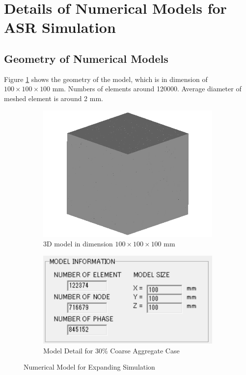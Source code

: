 \section{Details of Numerical Models for ASR Simulation}

\subsection{Geometry of Numerical Models}

Figure \ref{fig:model} shows the geometry of the model, which is in dimension of $100 \times 100 \times 100$ mm. Numbers of elements around 120000. Average diameter of meshed element is around 2 mm.

\begin{figure}[ht!]
\centering
\begin{subfigure}{.5\textwidth}
  \centering
  \includegraphics[width=.6\linewidth]{Files/exp_3D/Undamaged.png}
  \caption{3D model in dimension $100 \times 100 \times 100$ mm}
\end{subfigure}%
\begin{subfigure}{.5\textwidth}
  \centering
  \includegraphics[width=.8\linewidth]{Files/Model/A30.png}
  \caption{Model Detail for 30\% Coarse Aggregate Case}
\end{subfigure}
\caption{Numerical Model for Expanding Simulation}
\label{fig:model}
\end{figure}

